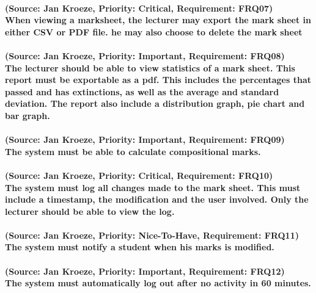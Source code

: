 \documentclass[12pt]{article}
\begin{document}
  \paragraph{(Source: Jan Kroeze, Priority: Critical, Requirement: FRQ07) \\
  When viewing a marksheet, the lecturer may export the mark sheet in either CSV or PDF file. he may also choose to delete the mark sheet}
  \paragraph{(Source: Jan Kroeze, Priority: Important, Requirement: FRQ08) \\
  The lecturer should be able to view statistics of a mark sheet.  This report must be exportable as a pdf. This includes the percentages that passed and has extinctions, as well as the average and standard deviation. The report also include a distribution graph, pie chart and bar graph.}
  \paragraph{(Source: Jan Kroeze, Priority: Important, Requirement: FRQ09) \\
  The system must be able to calculate compositional marks.}
  \paragraph{(Source: Jan Kroeze, Priority: Critical, Requirement: FRQ10) \\
  The system must log all changes made to the mark sheet. This must include a timestamp, the modification and the user involved. Only the lecturer should be able to view the log.}
  \paragraph{(Source: Jan Kroeze, Priority: Nice-To-Have, Requirement: FRQ11) \\
  The system must notify a student when his marks is modified.}
  \paragraph{(Source: Jan Kroeze, Priority: Important, Requirement: FRQ12) \\
  The system must automatically log out after no activity in 60 minutes.}
\end{document}
